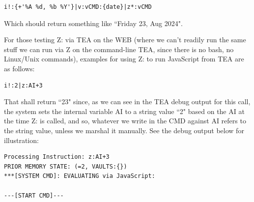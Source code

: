 \documentclass[a4paper, 18pt]{book} %
\begin{document}
{{{\vspace{2em}

  \begin{tcolorbox}[teaterminalstyle, title=Z: EXAMPLE 4: Obtain Custom Formatted Date/Time-stamp in TEA on the CLI, breakable]
  \begin{lstlisting}[language=TEA,breaklines=true,]
i!:{+'%A %d, %b %Y'}|v:vCMD:{date}|z*:vCMD
   \end{lstlisting}
  \end{tcolorbox}

\vspace{2em}

Which should return something like  ``Friday 23, Aug 2024".


\vspace{2em}


For those testing Z: via TEA on the WEB (where we can't readily run the same stuff we can run via Z on the command-line TEA, since there is no bash, no Linux/Unix commands), examples for using Z: to run JavaScript from TEA are as follows:



\vspace{2em}

  \begin{tcolorbox}[teaterminalstyle, title=Z: EXAMPLE 5: Running JavaScript from TEA on the WEB, breakable]
  \begin{lstlisting}[language=TEA,breaklines=true,]
i!:2|z:AI+3 
   \end{lstlisting}
  \end{tcolorbox}

\vspace{2em}


That shall return ``23" since, as we can see in the TEA debug output for this call, the system sets the internal variable AI to a string value ``2" based on the AI at the time Z: is called, and so, whatever we write in the CMD against AI refers to the string value, unless we marshal it manually. See the debug output below for illustration:


\vspace{2em}

{
  \begin{tcolorbox}[myterminalstyle, title=Debugging WEB TEA (EXAMPLE 5)]
  \begin{lstlisting}
Processing Instruction: z:AI+3
PRIOR MEMORY STATE: (=2, VAULTS:{})
***[SYSTEM CMD]: EVALUATING via JavaScript:

---[START CMD]---


\end{lstlisting}
\end{tcolorbox}}}}}
\end{document}
